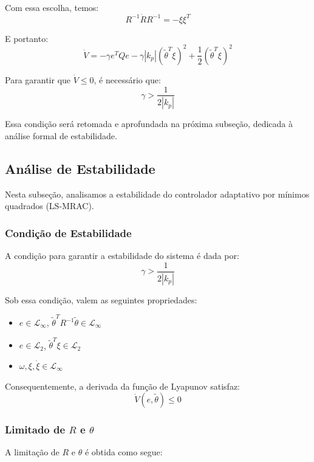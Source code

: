 \documentclass[10pt]{article}
\begin{document}
Com essa escolha, temos:
\[
R^{-1} \dot{R} R^{-1} = -\xi \xi^T
\]

E portanto:
\[
\dot{V} = -\gamma e^T Q e - \gamma |k_p| (\tilde{\theta}^T \xi)^2 + \frac{1}{2} (\tilde{\theta}^T \xi)^2
\]


Para garantir que $\dot{V} \leq 0$, é necessário que:
\[
\gamma > \frac{1}{2 |k_p|}
\]

Essa condição será retomada e aprofundada na próxima subseção, dedicada à análise formal de estabilidade.

\subsection{Análise de Estabilidade}

Nesta subseção, analisamos a estabilidade do controlador adaptativo por mínimos quadrados (LS-MRAC).

\subsubsection{Condição de Estabilidade}

A condição para garantir a estabilidade do sistema é dada por:
\[
\gamma > \frac{1}{2|k_p|}
\]

Sob essa condição, valem as seguintes propriedades:

\begin{itemize}
    \item $e \in \mathcal{L}_\infty$, \quad $\tilde{\theta}^T R^{-1} \tilde{\theta} \in \mathcal{L}_\infty$
    \item $e \in \mathcal{L}_2$, \quad $\tilde{\theta}^T \xi \in \mathcal{L}_2$
    \item $\omega, \xi, \dot{\xi} \in \mathcal{L}_\infty$
\end{itemize}

Consequentemente, a derivada da função de Lyapunov satisfaz:
\[
\dot{V}(e, \tilde{\theta}) \leq 0
\]

\subsubsection{Limitado de $R$ e $\theta$}

A limitação de $R$ e $\theta$ é obtida como segue:
\end{document}
